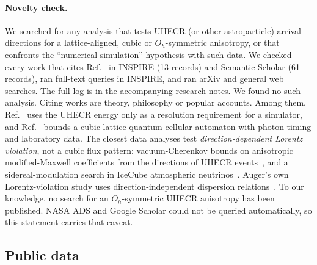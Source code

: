 \paragraph{Novelty check.}
We searched for any analysis that tests UHECR (or other astroparticle) arrival
directions for a lattice-aligned, cubic or $O_h$-symmetric anisotropy, or that
confronts the ``numerical simulation'' hypothesis with such data. We checked
every work that cites Ref.~\cite{Beane2014constraints} in INSPIRE (13 records)
and Semantic Scholar (61 records), ran full-text queries in INSPIRE, and ran
arXiv and general web searches. The full log is in the accompanying research
notes. We found no such analysis. Citing works are theory, philosophy or popular
accounts. Among them, Ref.~\cite{Vazza2025astrophysical} uses the UHECR energy
only as a resolution requirement for a simulator, and
Ref.~\cite{Mlodinow2025bounds} bounds a cubic-lattice quantum cellular
automaton with photon timing and laboratory data. The closest data analyses test
\emph{direction-dependent Lorentz violation}, not a cubic flux pattern:
vacuum-Cherenkov bounds on anisotropic modified-Maxwell coefficients from the
directions of UHECR events~\cite{Klinkhamer2008ultrahigh}, and a sidereal-modulation
search in IceCube atmospheric neutrinos~\cite{IceCube2010search}. Auger's own
Lorentz-violation study uses direction-independent dispersion
relations~\cite{PierreAuger2022testing}. To our knowledge, no search for an
$O_h$-symmetric UHECR anisotropy has been published. NASA ADS and Google Scholar
could not be queried automatically, so this statement carries that caveat.

\subsection{Public data}
\label{sec:uhecr:data}

